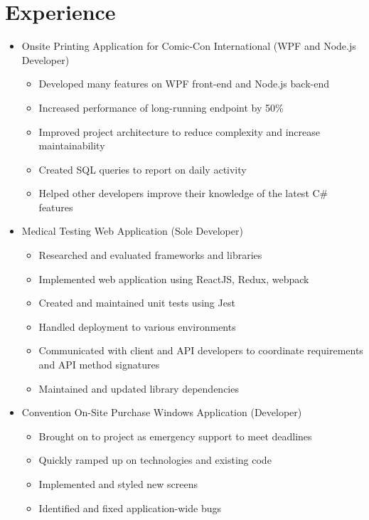 \documentclass[12pt,letterpaper,sans]{moderncv}
\begin{document}
\section{Experience}
    \begin{itemize}[leftmargin=1.24in]
    	\item Onsite Printing Application for Comic-Con International (WPF and Node.js Developer)
    		\begin{itemize}
    			\item Developed many features on WPF front-end and Node.js back-end
    			\item Increased performance of long-running endpoint by 50\%
    			\item Improved project architecture to reduce complexity and increase maintainability
    			\item Created SQL queries to report on daily activity
    			\item Helped other developers improve their knowledge of the latest C\# features
   			\end{itemize}
    	\item Medical Testing Web Application (Sole Developer)
	    	\begin{itemize}
	    		\item Researched and evaluated frameworks and libraries
	    		\item Implemented web application using ReactJS, Redux, webpack
	    		\item Created and maintained unit tests using Jest
	    		\item Handled deployment to various environments
	    		\item Communicated with client and API developers to coordinate requirements and API method signatures
	    		\item Maintained and updated library dependencies 
	    	\end{itemize} 
    	\item Convention On-Site Purchase Windows Application (Developer)
		    \begin{itemize}
			    \item Brought on to project as emergency support to meet deadlines
			    \item Quickly ramped up on technologies and existing code
			    \item Implemented and styled new screens
			    \item Identified and fixed application-wide bugs

\end{itemize}
\end{itemize}
\end{document}
